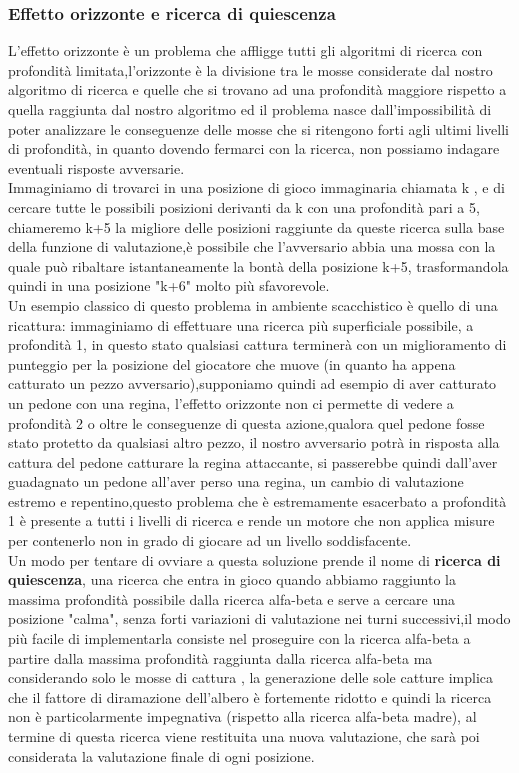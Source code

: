 \subsubsection{Effetto orizzonte e ricerca di quiescenza}
L'effetto orizzonte è un problema che affligge tutti gli algoritmi di ricerca con profondità limitata,l'orizzonte è la divisione 
tra le mosse considerate dal nostro algoritmo di ricerca e quelle  che si trovano ad una profondità maggiore rispetto a quella raggiunta dal nostro algoritmo 
ed il problema nasce dall'impossibilità di poter analizzare le conseguenze delle mosse che si ritengono forti agli ultimi livelli di profondità, in quanto dovendo fermarci con la ricerca,
non possiamo indagare eventuali risposte avversarie.\\
Immaginiamo di trovarci in una posizione di gioco immaginaria chiamata k , e di cercare tutte le possibili posizioni derivanti da k con una profondità pari a 5,
chiameremo k+5 la migliore delle posizioni raggiunte da queste ricerca sulla base della funzione di valutazione,è possibile che
l'avversario abbia una mossa con la quale può ribaltare istantaneamente la bontà della posizione k+5, trasformandola quindi in una posizione
"k+6" molto più sfavorevole.\\
Un esempio classico di questo problema in ambiente scacchistico è quello di una ricattura: immaginiamo 
di effettuare una ricerca più superficiale possibile, a profondità 1, in questo stato qualsiasi cattura terminerà con un miglioramento di punteggio 
per la posizione del giocatore che muove (in quanto ha appena catturato un pezzo avversario),supponiamo quindi ad esempio di aver catturato un pedone con una regina,
l'effetto orizzonte non ci permette di vedere a profondità 2 o oltre le conseguenze di questa azione,qualora quel pedone fosse stato 
protetto da qualsiasi altro pezzo, il nostro avversario potrà in risposta alla cattura del pedone catturare la regina attaccante,
si passerebbe quindi dall'aver guadagnato un pedone all'aver perso una regina, un cambio di valutazione estremo e repentino,questo problema che è estremamente esacerbato a profondità 1 è presente a tutti i livelli di ricerca e rende un motore che non applica misure per contenerlo 
non in grado di giocare ad un livello soddisfacente. 
\\Un modo per tentare di ovviare a questa soluzione prende il nome di \textbf{ricerca di quiescenza}, una ricerca che entra in gioco quando abbiamo raggiunto la massima 
profondità possibile dalla ricerca alfa-beta e serve a cercare una posizione "calma", senza forti variazioni di valutazione nei turni successivi,il modo più facile di implementarla consiste nel proseguire con la ricerca
alfa-beta a partire dalla massima profondità raggiunta dalla ricerca alfa-beta ma considerando solo le mosse di cattura , la generazione delle sole catture implica che il fattore di diramazione dell'albero è fortemente ridotto e quindi la 
ricerca non è particolarmente impegnativa (rispetto alla ricerca alfa-beta madre), al termine di questa ricerca viene restituita una nuova valutazione, che sarà poi considerata la valutazione finale di ogni posizione.


